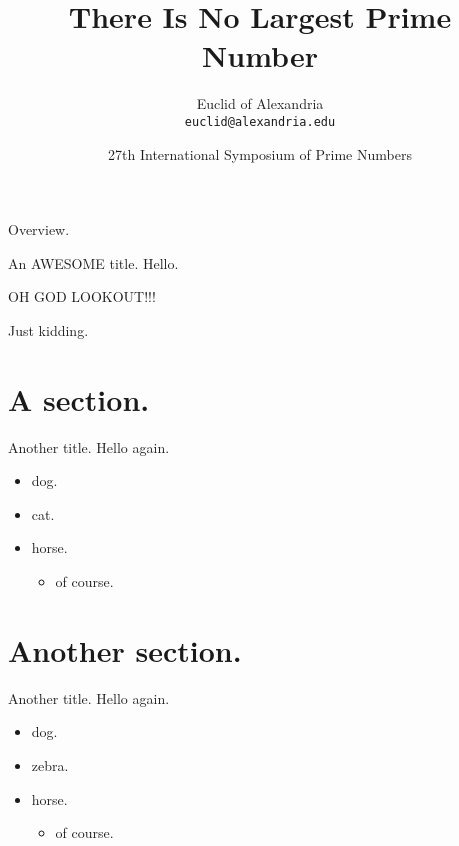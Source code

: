 \documentclass{beamer}
\title{There Is No Largest Prime Number}
\date[ISPN ’80]{27th International Symposium of Prime Numbers}
\author[Euclid]{Euclid of Alexandria \\ \texttt{euclid@alexandria.edu}}
\begin{document}
    \begin{frame}
        \titlepage
    \end{frame}

    \begin{sectionframe}{Overview.}
        \tableofcontents
    \end{sectionframe}


    \begin{frame}{An AWESOME title.}
        Hello.

        \alert{OH GOD LOOKOUT!!!}

        Just kidding.
    \end{frame}

    \section{A section.}
    \sectionslide

    \begin{frame}{Another title.}
        Hello again.
        \begin{itemize}
            \item dog.
            \item cat.
            \item horse.
                \begin{itemize}
                    \item of course.
            \end{itemize}
        \end{itemize}
    \end{frame}

    \section{Another section.}
    \sectionslide

    \begin{frame}{Another title.}
        Hello again.
        \begin{itemize}
            \item dog.
            \item zebra.
            \item horse.
                \begin{itemize}
                    \item of course.
            \end{itemize}
        \end{itemize}
    \end{frame}
\end{document}
